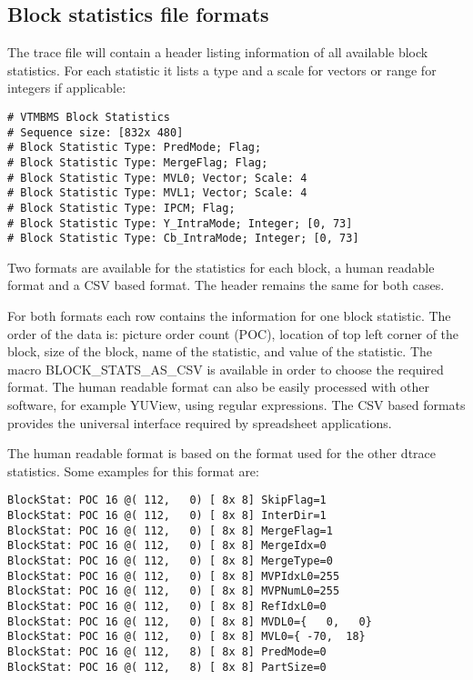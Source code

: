 \documentclass[a4paper,11pt]{jvetdoc}
\begin{document}
\subsection{Block statistics file formats}
\label{sec:block-stat-file}
The trace file will contain a header listing information of all available block
statistics. For each statistic it lists a type and a scale for vectors or range
for integers if applicable: 
\begin{verbatim}
# VTMBMS Block Statistics
# Sequence size: [832x 480]
# Block Statistic Type: PredMode; Flag; 
# Block Statistic Type: MergeFlag; Flag; 
# Block Statistic Type: MVL0; Vector; Scale: 4
# Block Statistic Type: MVL1; Vector; Scale: 4
# Block Statistic Type: IPCM; Flag; 
# Block Statistic Type: Y_IntraMode; Integer; [0, 73]
# Block Statistic Type: Cb_IntraMode; Integer; [0, 73]
\end{verbatim}

Two formats are available for the statistics for each block, a human readable
format and a CSV based format. The header remains the same for both cases. 

For both formats each row contains the information for one block statistic. The
order of the data is: picture order count (POC), location of top left corner of
the block, size of the block, name of the statistic, and value of the
statistic. 
The macro BLOCK_STATS_AS_CSV is available in order to choose the required format.
The human readable format can also be easily processed with other software, for
example YUView, using regular expressions. The CSV based formats provides the
universal interface required by spreadsheet applications.

The human readable format is based on the format used for the other dtrace
statistics. Some examples for this format are:
\begin{verbatim}
BlockStat: POC 16 @( 112,   0) [ 8x 8] SkipFlag=1
BlockStat: POC 16 @( 112,   0) [ 8x 8] InterDir=1
BlockStat: POC 16 @( 112,   0) [ 8x 8] MergeFlag=1
BlockStat: POC 16 @( 112,   0) [ 8x 8] MergeIdx=0
BlockStat: POC 16 @( 112,   0) [ 8x 8] MergeType=0
BlockStat: POC 16 @( 112,   0) [ 8x 8] MVPIdxL0=255
BlockStat: POC 16 @( 112,   0) [ 8x 8] MVPNumL0=255
BlockStat: POC 16 @( 112,   0) [ 8x 8] RefIdxL0=0
BlockStat: POC 16 @( 112,   0) [ 8x 8] MVDL0={   0,   0}
BlockStat: POC 16 @( 112,   0) [ 8x 8] MVL0={ -70,  18}
BlockStat: POC 16 @( 112,   8) [ 8x 8] PredMode=0
BlockStat: POC 16 @( 112,   8) [ 8x 8] PartSize=0
\end{verbatim}
\end{document}
